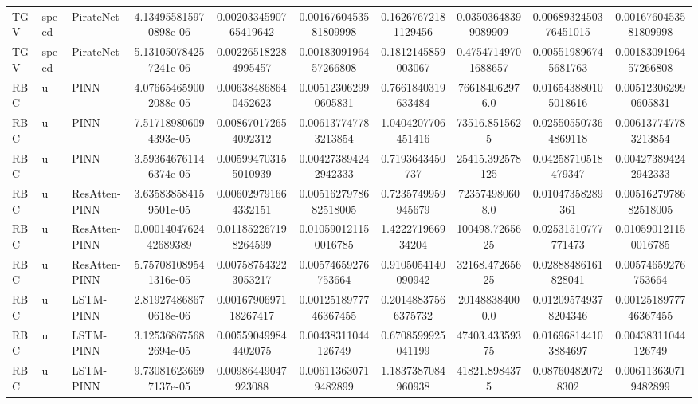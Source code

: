 \begin{landscape}
\begin{longtable}{lllccccccc}
 TGV & speed &      PirateNet &  4.134955815970898e-06 &  0.0020334590765419642 &  0.0016760453581809998 &  0.16267672181129456 &   0.03503648399089909 & 0.0068932450376451015 &  0.0016760453581809998 \\
 TGV & speed &      PirateNet &  5.131050784257241e-06 &   0.002265182284995457 &  0.0018309196457266808 &   0.1812145859003067 &   0.47547149701688657 &  0.005519896745681763 &  0.0018309196457266808 \\
 RBC &     u &           PINN &  4.076654659002088e-05 &   0.006384868640452623 &   0.005123062990605831 &   0.7661840319633484 &        766184062976.0 &  0.016543880105018616 &   0.005123062990605831 \\
 RBC &     u &           PINN &  7.517189806094393e-05 &   0.008670172654092312 &   0.006137747783213854 &   1.0404207706451416 &         73516.8515625 &  0.025505507364869118 &   0.006137747783213854 \\
 RBC &     u &           PINN &  3.593646761146374e-05 &   0.005994703155010939 &   0.004273894242942333 &      0.7193643450737 &       25415.392578125 &   0.04258710518479347 &   0.004273894242942333 \\
 RBC &     u &  ResAtten-PINN &  3.635838584159501e-05 &   0.006029791664332151 &  0.0051627978682518005 &   0.7235749959945679 &        723574980608.0 &      0.01047358289361 &  0.0051627978682518005 \\
 RBC &     u &  ResAtten-PINN &  0.0001404762442689389 &   0.011852267198264599 &   0.010590121150016785 &    1.422271966934204 &        100498.7265625 &   0.02531510777771473 &   0.010590121150016785 \\
 RBC &     u &  ResAtten-PINN &  5.757081089541316e-05 &   0.007587543223053217 &    0.00574659276753664 &   0.9105054140090942 &        32168.47265625 &   0.02888486161828041 &    0.00574659276753664 \\
 RBC &     u &      LSTM-PINN &  2.819274868670618e-06 &  0.0016790697118267417 &  0.0012518977746367455 &  0.20148837566375732 &        201488384000.0 &  0.012095749378204346 &  0.0012518977746367455 \\
 RBC &     u &      LSTM-PINN &  3.125368675682694e-05 &   0.005590499844402075 &    0.00438311044126749 &   0.6708599925041199 &        47403.43359375 &  0.016968144103884697 &    0.00438311044126749 \\
 RBC &     u &      LSTM-PINN &  9.730816236697137e-05 &    0.00986449047923088 &   0.006113630719482899 &   1.1837387084960938 &         41821.8984375 &     0.087604820728302 &   0.006113630719482899 \\

\end{longtable}
\end{landscape}

